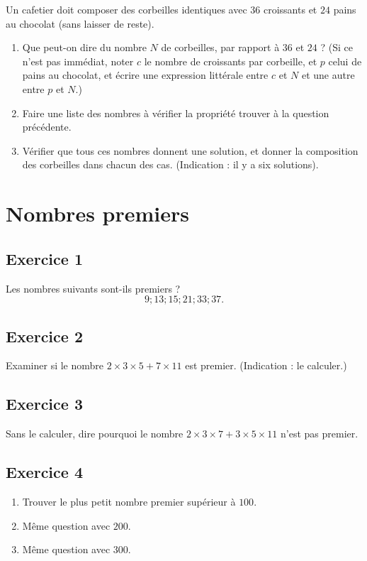 \documentclass[12 pt]{article}
\theoremstyle{plain}
\newcounter{n}
\numberwithin{n}{section}
\begin{document}
Un cafetier doit composer des corbeilles identiques avec $36$ croissants et $24$ pains au chocolat (sans laisser de reste). 
\begin{enumerate}
\item Que peut-on dire du nombre $N$ de corbeilles, par rapport à $36$ et $24$ ? (Si ce n'est pas immédiat, noter $c$ le nombre de croissants par corbeille, et $p$ celui de pains au chocolat, et écrire une expression littérale entre $c$ et $N$ et une autre entre $p$ et $N$.)
\item Faire une liste des nombres à vérifier la propriété trouver à la question précédente. 
\item Vérifier que tous ces nombres donnent une solution, et donner la composition des corbeilles dans chacun des cas. (Indication : il y a six solutions). 
\end{enumerate}

\section*{Nombres premiers}
\subsection*{Exercice 1}

Les nombres suivants sont-ils premiers ? 
\[ 9 ; 13 ; 15 ; 21 ; 33; 37.\]

\subsection*{Exercice 2}

Examiner si le nombre $2\times 3 \times 5 + 7 \times 11$ est premier. (Indication : le calculer.)


\subsection*{Exercice 3}

Sans le calculer, dire pourquoi le nombre $2\times 3 \times 7 + 3 \times 5 \times 11$ n'est pas premier. 

\subsection*{Exercice 4}

\begin{enumerate}\item Trouver le plus petit nombre premier supérieur à $100$.
\item Même question avec $200$. 
\item Même question avec $300$. 
\end{enumerate}
\end{document}
